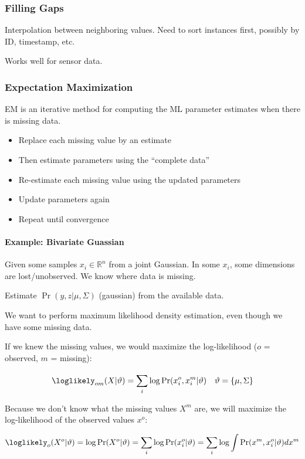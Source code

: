 \documentclass{idc_msc}
\begin{document}
\subsubsection{Filling Gaps}

Interpolation between neighboring values.
Need to sort instances first, possibly by ID, timestamp, etc.

Works well for sensor data.

\subsubsection{Expectation Maximization}

EM is an iterative method for computing the ML parameter estimates when there is missing data.

\begin{itemize}
  \item Replace each missing value by an estimate
  \item Then estimate parameters using the ``complete data''
  \item Re-estimate each missing value using the updated parameters
  \item Update parameters again
  \item Repeat until convergence
\end{itemize}

\paragraph{Example: Bivariate Guassian}

Given some samples $x_i \in \mathbb{R}^n$ from a joint Gaussian.
In some $x_i$, some dimensions are lost/unobserved.
We know where data is missing.

Estimate $\Pr(y,z|\mu,\Sigma)$ (gaussian) from the available data.

We want to perform maximum likelihood density estimation, even though we have some missing data.

If we knew the missing values, we would maximize the log-likelihood ($o$ = observed, $m$ = missing):

\[\loglikely_{om}(X|\vartheta)=\sum_{i}^{}\log \Pr(x_i^o,x_i^m|\vartheta) \quad \vartheta=\{\mu,\Sigma\}\]

Because we don't know what the missing values \(X^m\) are, we will maximize the log-likelihood of the observed values $x^o$:

\[\loglikely_{o}(X^o|\vartheta)=\log \Pr(X^o|\vartheta)=\sum_{i}\log \Pr(x_i^o|\vartheta)=\sum_i\log\int\Pr(x^m,x_i^o|\vartheta) dx^m\]
\end{document}
